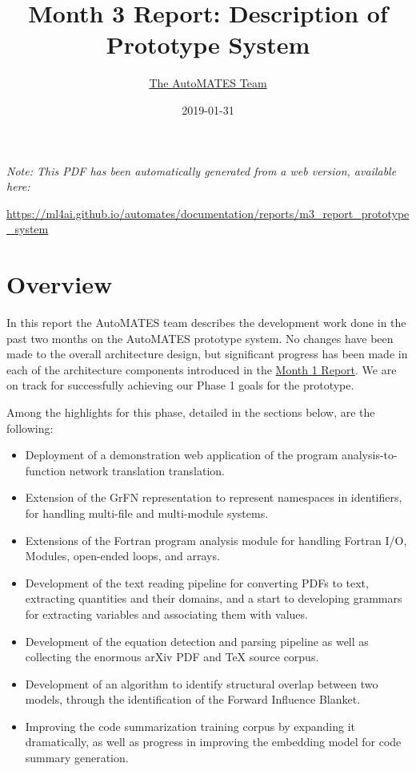 \documentclass[article, 12pt, oneside]{memoir}
\title{Month 3 Report: Description of Prototype System}
\author{\href{https://ml4ai.github.io/automates/team/}{The AutoMATES Team}}
\date{2019-01-31}
\begin{document}
\maketitle
\tableofcontents*

\bigskip
\bigskip

\noindent \emph{Note: This PDF has been automatically generated from a web
  version, available here:}

  {
  \small
\noindent \url{https://ml4ai.github.io/automates/documentation/reports/m3_report_prototype_system}
}

\hypertarget{overview}{%
\section{Overview}\label{overview}}

In this report the AutoMATES team describes the development work done in
the past two months on the AutoMATES prototype system. No changes have
been made to the overall architecture design, but significant progress
has been made in each of the architecture components introduced in the
\href{https://ml4ai.github.io/automates/documentation/reports/m1_architecture_report/}{Month
1 Report}. We are on track for successfully achieving our Phase 1 goals
for the prototype.

Among the highlights for this phase, detailed in the sections below, are
the following:

\begin{itemize}
\item
  Deployment of a demonstration web application of the program
  analysis-to-function network translation translation.
\item
  Extension of the GrFN representation to represent namespaces in
  identifiers, for handling multi-file and multi-module systems.
\item
  Extensions of the Fortran program analysis module for handling Fortran
  I/O, Modules, open-ended loops, and arrays.
\item
  Development of the text reading pipeline for converting PDFs to text,
  extracting quantities and their domains, and a start to developing
  grammars for extracting variables and associating them with values.
\item
  Development of the equation detection and parsing pipeline as well as
  collecting the enormous arXiv PDF and TeX source corpus.
\item
  Development of an algorithm to identify structural overlap between two
  models, through the identification of the Forward Influence Blanket.
\item
  Improving the code summarization training corpus by expanding it
  dramatically, as well as progress in improving the embedding model for
  code summary generation.
\end{itemize}
\end{document}
